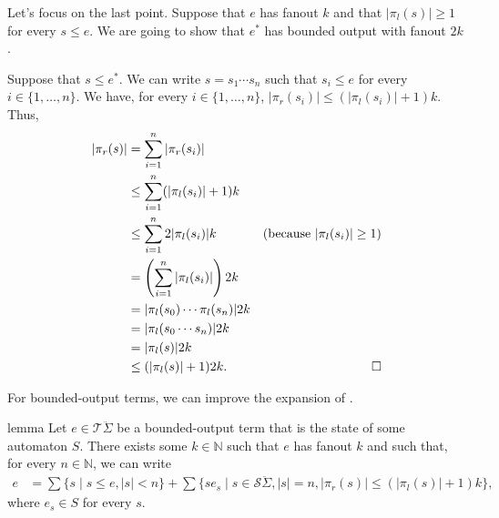 \documentclass[11pt,a4paper]{amsart}
\theoremstyle{definition}
\begin{document}
\begin{proofEnd}
  Let's focus on the last point.  Suppose that $e$ has fanout $k$ and that
  $| \pi _l(s)|  \geq  1$ for every $s  \leq  e$.  We are going to show that $e^*$ has bounded
  output with fanout $2k$.

  Suppose that $s  \leq  e^*$.  We can write $s = s_1  \cdots  s_n$ such that $s_i  \leq  e$ for
  every $i  \in  \{1,  \ldots , n\}$.  We have, for every $i  \in  \{1, \ldots ,n\}$,
  $| \pi _r(s_i)|  \leq  (| \pi _l(s_i)| + 1)k.$ Thus,
  \begin{align*}
    | \pi _r(s)|
    & =  \sum _{i=1}^n | \pi _r(s_i)| \\
    &  \leq   \sum _{i=1}^n (| \pi _l(s_i)| + 1)k \\
    &  \leq   \sum _{i=1}^n 2| \pi _l(s_i)|k
    & (\text{because $| \pi _l(s_i)|  \geq  1$}) \\
    & = \left( \sum _{i=1}^n| \pi _l(s_i)|\right)2k \\
    & = | \pi _l(s_0)  \cdots   \pi _l(s_n)|2k\\
    & = | \pi _l(s_0  \cdots  s_n)|2k  \\
    & = | \pi _l(s)|2k \\
    &  \leq  (| \pi _l(s)| + 1)2k. & \qedhere
  \end{align*}
\end{proofEnd}

For bounded-output terms, we can improve the expansion of .

\begin{theoremEnd}{lemma}
  \label{lem:expansion-bounded-output}
  Let $e  \in  \mathcal{T}\ddot{ \Sigma }$ be a bounded-output term that is the state of
  some automaton $S$. There exists some $k  \in  \mathbb{N}$ such that $e$ has fanout $k$ and
  such that, for every $n  \in  \mathbb{N}$, we can write
  \begin{align*}
    e
    & =  \sum \{s \mid s  \leq  e, |s| < n\} + %
     \sum \{se_s \mid s  \in  \mathcal{S}\ddot{ \Sigma }, |s|=n, | \pi _r(s)|  \leq  (| \pi _l(s)|+1)k\},
  \end{align*}
  where $e_s  \in  S$ for every $s$.
\end{theoremEnd}
\end{document}
